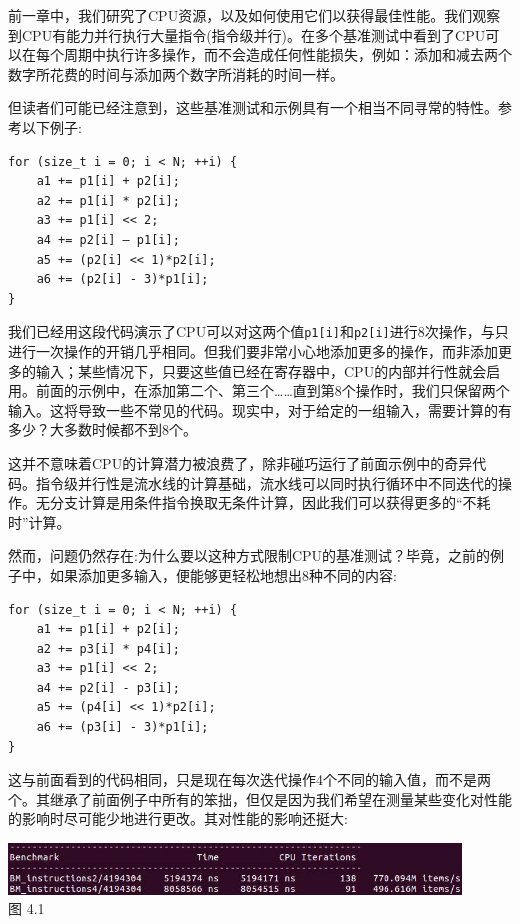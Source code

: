 
前一章中，我们研究了CPU资源，以及如何使用它们以获得最佳性能。我们观察到CPU有能力并行执行大量指令(指令级并行)。在多个基准测试中看到了CPU可以在每个周期中执行许多操作，而不会造成任何性能损失，例如：添加和减去两个数字所花费的时间与添加两个数字所消耗的时间一样。

但读者们可能已经注意到，这些基准测试和示例具有一个相当不同寻常的特性。参考以下例子:

\begin{lstlisting}[style=styleCXX]
for (size_t i = 0; i < N; ++i) {
	a1 += p1[i] + p2[i];
	a2 += p1[i] * p2[i];
	a3 += p1[i] << 2;
	a4 += p2[i] – p1[i];
	a5 += (p2[i] << 1)*p2[i];
	a6 += (p2[i] - 3)*p1[i];
}
\end{lstlisting}

我们已经用这段代码演示了CPU可以对这两个值\texttt{p1[i]}和\texttt{p2[i]}进行8次操作，与只进行一次操作的开销几乎相同。但我们要非常小心地添加更多的操作，而非添加更多的输入；某些情况下，只要这些值已经在寄存器中，CPU的内部并行性就会启用。前面的示例中，在添加第二个、第三个……直到第8个操作时，我们只保留两个输入。这将导致一些不常见的代码。现实中，对于给定的一组输入，需要计算的有多少？大多数时候都不到8个。

这并不意味着CPU的计算潜力被浪费了，除非碰巧运行了前面示例中的奇异代码。指令级并行性是流水线的计算基础，流水线可以同时执行循环中不同迭代的操作。无分支计算是用条件指令换取无条件计算，因此我们可以获得更多的“不耗时”计算。

然而，问题仍然存在:为什么要以这种方式限制CPU的基准测试？毕竟，之前的例子中，如果添加更多输入，便能够更轻松地想出8种不同的内容:

\begin{lstlisting}[style=styleCXX]
for (size_t i = 0; i < N; ++i) {
	a1 += p1[i] + p2[i];
	a2 += p3[i] * p4[i];
	a3 += p1[i] << 2;
	a4 += p2[i] - p3[i];
	a5 += (p4[i] << 1)*p2[i];
	a6 += (p3[i] - 3)*p1[i];
}
\end{lstlisting}

这与前面看到的代码相同，只是现在每次迭代操作4个不同的输入值，而不是两个。其继承了前面例子中所有的笨拙，但仅是因为我们希望在测量某些变化对性能的影响时尽可能少地进行更改。其对性能的影响还挺大:

\begin{center}
\includegraphics[width=0.9\textwidth]{content/1/chapter4/images/1.jpg}\\
图 4.1
\end{center}

